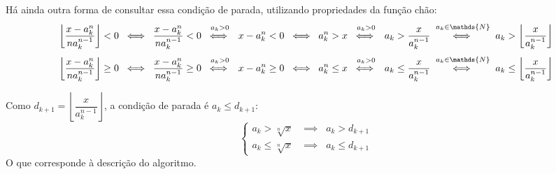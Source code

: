 Há ainda outra forma de consultar essa condição de parada,
utilizando propriedades da função chão:
\[
  \left\lfloor \dfrac{x - a_k^n}{na_k^{n-1}} \right\rfloor < 0
  \;\iff\;
  \dfrac{x - a_k^n}{na_k^{n-1}} < 0
  \;\stackrel{a_k > 0}{\iff\rule{0pt}{.7em}}\;
  x - a_k^n < 0
  \;\iff\;
  a_k^n > x
  \;\stackrel{a_k > 0}{\iff\rule{0pt}{.7em}}\;
  a_k > \dfrac{x}{a_k^{n-1}}
  \;\stackrel{a_k \in \mathds{N}}{\iff\rule{0pt}{.7em}}\;
  a_k > \left\lfloor \dfrac{x}{a_k^{n-1}} \right\rfloor
\]
\[
  \left\lfloor \dfrac{x - a_k^n}{na_k^{n-1}} \right\rfloor \ge 0
  \;\iff\;
  \dfrac{x - a_k^n}{na_k^{n-1}} \ge 0
  \;\stackrel{a_k > 0}{\iff\rule{0pt}{.7em}}\;
  x - a_k^n \ge 0
  \;\iff\;
  a_k^n \le x
  \;\stackrel{a_k > 0}{\iff\rule{0pt}{.7em}}\;
  a_k \le \dfrac{x}{a_k^{n-1}}
  \;\stackrel{a_k \in \mathds{N}}{\iff\rule{0pt}{.7em}}\;
  a_k \le \left\lfloor \dfrac{x}{a_k^{n-1}} \right\rfloor
\]

Como $d_{k+1} = \left\lfloor \dfrac{x}{a_k^{n-1}} \right\rfloor$,
a condição de parada é $a_k \le d_{k+1}$:
\[
\begin{cases}
  a_k > \sqrt[n]{x} &\implies\;\; a_k > d_{k+1} \\
  a_k \le \sqrt[n]{x} &\implies\;\; a_k \le d_{k+1}
\end{cases}
\]
O que corresponde à descrição do algoritmo.
